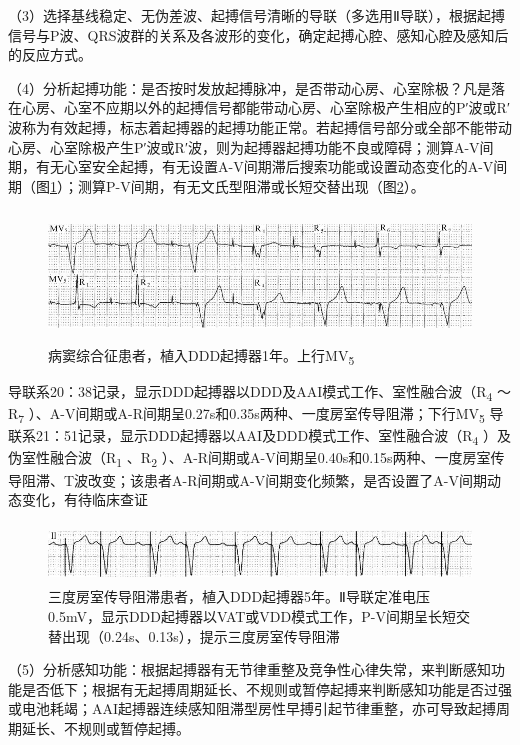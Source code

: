 （3）选择基线稳定、无伪差波、起搏信号清晰的导联（多选用Ⅱ导联），根据起搏信号与P波、QRS波群的关系及各波形的变化，确定起搏心腔、感知心腔及感知后的反应方式。

（4）分析起搏功能：是否按时发放起搏脉冲，是否带动心房、心室除极？凡是落在心房、心室不应期以外的起搏信号都能带动心房、心室除极产生相应的P′波或R′波称为有效起搏，标志着起搏器的起搏功能正常。若起搏信号部分或全部不能带动心房、心室除极产生P′波或R′波，则为起搏器起搏功能不良或障碍；测算A-V间期，有无心室安全起搏，有无设置A-V间期滞后搜索功能或设置动态变化的A-V间期（图\ref{fig38-43}）；测算P-V间期，有无文氏型阻滞或长短交替出现（图\ref{fig38-44}）。

\begin{figure}[!htbp]
 \centering
 \includegraphics[width=5.58333in,height=1.36458in]{./images/Image00646.jpg}
 \captionsetup{justification=centering}
 \caption{病窦综合征患者，植入DDD起搏器1年。上行MV\textsubscript{5}}
 \label{fig38-43}
  \end{figure} 
导联系20：38记录，显示DDD起搏器以DDD及AAI模式工作、室性融合波（R\textsubscript{4}
～R\textsubscript{7}
）、A-V间期或A-R间期呈0.27s和0.35s两种、一度房室传导阻滞；下行MV\textsubscript{5}
导联系21：51记录，显示DDD起搏器以AAI及DDD模式工作、室性融合波（R\textsubscript{4}
）及伪室性融合波（R\textsubscript{1} 、R\textsubscript{2}
）、A-R间期或A-V间期呈0.40s和0.15s两种、一度房室传导阻滞、T波改变；该患者A-R间期或A-V间期变化频繁，是否设置了A-V间期动态变化，有待临床查证

\begin{figure}[!htbp]
 \centering
 \includegraphics[width=5.58333in,height=0.61458in]{./images/Image00647.jpg}
 \captionsetup{justification=centering}
 \caption{三度房室传导阻滞患者，植入DDD起搏器5年。Ⅱ导联定准电压0.5mV，显示DDD起搏器以VAT或VDD模式工作，P-V间期呈长短交替出现（0.24s、0.13s），提示三度房室传导阻滞}
 \label{fig38-44}
  \end{figure} 

（5）分析感知功能：根据起搏器有无节律重整及竞争性心律失常，来判断感知功能是否低下；根据有无起搏周期延长、不规则或暂停起搏来判断感知功能是否过强或电池耗竭；AAI起搏器连续感知阻滞型房性早搏引起节律重整，亦可导致起搏周期延长、不规则或暂停起搏。

